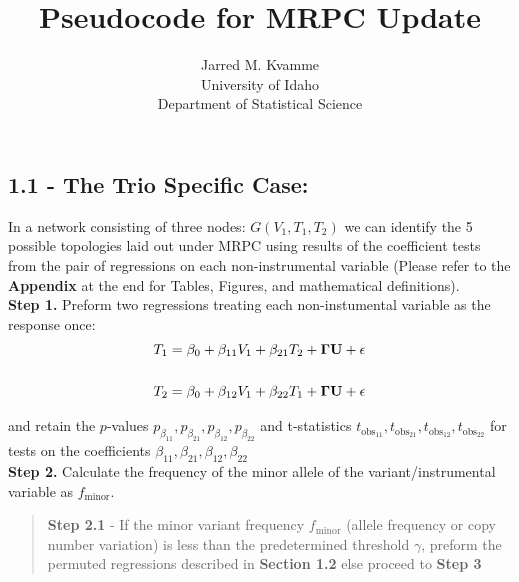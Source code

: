 \documentclass[12pt]{report}
\begin{document}
\begin{titlepage}
\title{Pseudocode for MRPC Update}
\author{ Jarred M. Kvamme \\ University of Idaho \\ Department of Statistical Science }
\maketitle
\end{titlepage}

\newcommand{\indep}{\perp \!\!\! \perp}



\subsection*{1.1 - The Trio Specific Case:}

In a network consisting of three nodes: $G(V_1, T_1, T_2)$ we can identify the 5 possible topologies laid out under MRPC using results of the coefficient tests from the pair of regressions on each non-instrumental variable (Please refer to the \textbf{Appendix} at the end for Tables, Figures, and mathematical definitions).\\


\noindent \textbf{Step 1.} Preform two regressions treating each non-instumental variable as the response once:  
\begin{eqnarray}
T_1 = \beta_0 +\beta_{11}V_1+\beta_{21}T_2+{\bf \Gamma U}+ \epsilon \\
\nonumber\\
T_2 = \beta_0 +\beta_{12}V_1+\beta_{22}T_1+{\bf \Gamma U}+ \epsilon 
\end{eqnarray}

and retain the $p$-values $p_{\beta_{11}}, p_{\beta_{21}}, p_{\beta_{12}}, p_{\beta_{22}}$ and t-statistics $t_{\text{obs}_{11}},t_{\text{obs}_{21}},t_{\text{obs}_{12}},t_{\text{obs}_{22}}$ for tests on the coefficients $\beta_{11}, \beta_{21}, \beta_{12}, \beta_{22}$\\

\noindent \textbf{Step 2.} Calculate the frequency of the minor allele of the variant/instrumental variable as $f_{\text{minor}}$. \\

\begin{quote}
\textbf{Step 2.1} - If the minor variant frequency $f_{\text{minor}}$ (allele frequency or copy number variation) is less than the predetermined threshold $\gamma$, preform the permuted regressions described in \textbf{Section 1.2} else proceed to \textbf{Step 3}
\end{quote}
\end{document}
